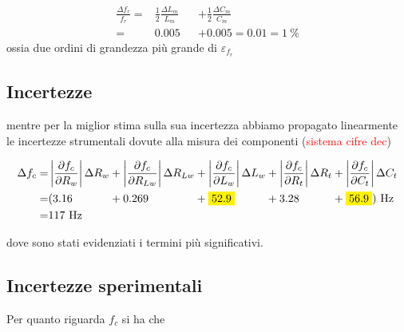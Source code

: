 \documentclass[12pt,italian]{article}
\newcommand{\err}[1]{\textcolor{red}{#1}}
\begin{document}
\begin{equation*}
	\begin{alignedat}{2}
		\frac{\Delta f_{r}}{f_{r}} = & \frac{1}{2} \frac{\Delta L_{m}}{L_{m}} &  & + \frac{1}{2} \frac{\Delta C_{m}}{C_{m}} \\
		=                            & 0.005                                  &  & + 0.005
		= 0.01 = 1 \ \%
	\end{alignedat}
\end{equation*}
ossia due ordini di grandezza più grande di $\varepsilon_{f_r}$

\subsection{Incertezze}

\noindent
mentre per la miglior stima sulla sua incertezza abbiamo propagato linearmente
le incertezze strumentali dovute alla misura dei componenti (\err{sistema cifre dec})

\begin{equation*}
	\begin{alignedat}{5}
		\Delta f_{c} = & \left|\frac{\partial f_{c}}{\partial R_{w}}\right| \Delta R_{w} &  & +  \left|\frac{\partial f_{c}}{\partial R_{Lw}}\right| \Delta R_{Lw} &  & + \left|\frac{\partial f_{c}}{\partial L_{w}}\right| \Delta L_{w} &  & + \left|\frac{\partial f_{c}}{\partial R_{t}}\right| \Delta R_{t} &  & + \left|\frac{\partial f_{c}}{\partial C_{t}}\right| \Delta C_{t} \\
		=              & ( 3.16                                                          &  & +  0.269                                                             &  & + \colorbox{yellow}{52.9}                                         &  & + 3.28                                                            &  & + \colorbox{yellow}{56.9} ) \text{ Hz}                            \\
		=              & 117 \text{ Hz}
	\end{alignedat}
\end{equation*}

\noindent
dove sono stati evidenziati i termini più significativi.

\subsection{Incertezze sperimentali}
\label{sec:inc_sper}
Per quanto riguarda $f_{c}$ si ha che
\end{document}
